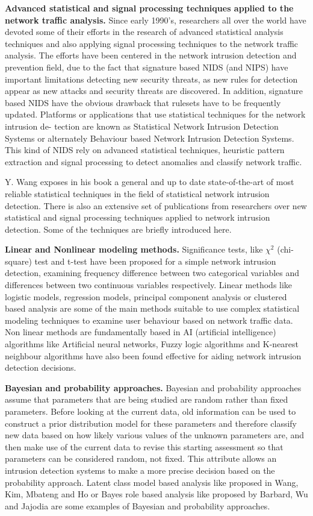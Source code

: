 \documentclass[thesis=M,english]{FITthesis}[2011/07/15]
\begin{document}
\textbf{Advanced statistical and signal processing techniques applied to the network traffic analysis.}
Since early 1990’s, researchers all over the world have devoted some of their efforts in the research of advanced statistical analysis techniques and also applying signal processing techniques to the network traffic analysis. The efforts have been centered in the network intrusion detection and prevention field, due to the fact that signature based NIDS (and NIPS) have important limitations detecting new security threats, as new rules for detection appear as new attacks and security threats are discovered. In addition,
signature based NIDS have the obvious drawback that rulesets have to be frequently updated. Platforms or applications that use statistical techniques for the network intrusion de-
tection are known as Statistical Network Intrusion Detection Systems or alternately Behaviour based Network Intrusion Detection Systems. This kind of NIDS rely on advanced statistical techniques, heuristic pattern extraction and signal processing to detect anomalies and classify network traffic.

Y. Wang exposes in his book a general and up to date state-of-the-art of most reliable statistical techniques in the field of statistical network intrusion detection. There
is also an extensive set of publications from researchers over new statistical and signal processing techniques applied to network intrusion detection. Some of the techniques
are briefly introduced here.

\textbf{Linear and Nonlinear modeling methods.}
Significance tests, like $\chi^2$ (chi-square) test and t-test have been proposed for a simple network intrusion detection, examining frequency difference between two categorical variables and differences between two continuous variables respectively. Linear methods like logistic models, regression models, principal component analysis or clustered based analysis are some of the main methods suitable to use complex statistical modeling techniques to examine user behaviour based on network traffic data. 
Non linear methods are fundamentally based in AI (artificial intelligence) algorithms like Artificial neural networks, Fuzzy logic algorithms and K-nearest neighbour algorithms have also been found effective for aiding network intrusion detection decisions.

\textbf{Bayesian and probability approaches.}
Bayesian and probability approaches assume that parameters that are being studied are random rather than fixed parameters. Before looking at the current data, old information can be used to construct a prior distribution model for these parameters and therefore classify new data based on how likely various values of the unknown parameters are, and then make use of the current data to revise this starting assessment so that parameters can be considered random, not fixed. This attribute allows an intrusion detection systems to make a more precise decision based on the probability approach. Latent class model based analysis like proposed in Wang, Kim, Mbateng and Ho or Bayes role based analysis like proposed by Barbard, Wu and Jajodia are some examples of Bayesian and probability approaches.
\end{document}
